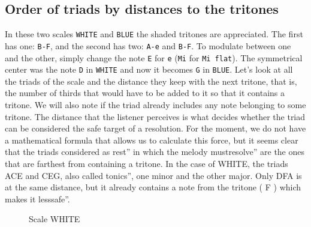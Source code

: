 \documentclass[]{report}
\begin{document}
\subsection{Order of triads by distances to the tritones}
In these two scales \texttt{WHITE} and \texttt{BLUE} the shaded tritones are appreciated. The first has one: \texttt{B-F}, and the second has two: \texttt{A-e} and \texttt{B-F}. To modulate between one and the other, simply change the note \texttt{E} for \texttt{e} (\texttt{Mi} for \texttt{Mi flat}). The symmetrical center was the note \texttt{D} in \texttt{WHITE} and now it becomes \texttt{G} in \texttt{BLUE}.
Let's look at all the triads of the scale and the distance they keep with the next tritone, that is, the number of thirds that would have to be added to it so that it contains a tritone. We will also note if the triad already includes any note belonging to some tritone. The distance that the listener perceives is what decides whether the triad can be considered the safe target of a resolution.
For the moment, we do not have a mathematical formula that allows us to calculate this force, but it seems clear that the triads considered as rest'' in which the melody mustresolve'' are the ones that are farthest from containing a tritone. In the case of \textsf{WHITE}, the triads \textsf{ACE} and \textsf{CEG}, also called tonics'', one minor and the other major. Only \textsf{DFA} is at the same distance, but it already contains a note from the tritone ( \textsf{F} ) which makes it lesssafe''.
\begin{figure}[H]
\centering
\begin{subfigure}{1\textwidth}
\centering
{}

\end{subfigure}
\caption{Scale \textsf{WHITE} }\label{fig:white-scale-distances}
\end{figure}
\end{document}
